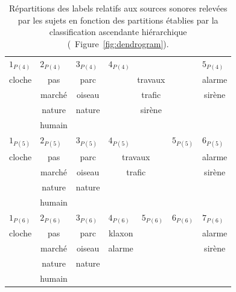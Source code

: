 \begin{table}[t]
\begin{tabular}{c|c|c|c|c|c|c}
\hline
\multicolumn{1}{l|}{$1_{P(4)}$} & \multicolumn{1}{l|}{$2_{P(4)}$} & \multicolumn{1}{l|}{$3_{P(4)}$}  & \multicolumn{3}{l|}{$4_{P(4)}$} & \multicolumn{1}{l}{$5_{P(4)}$} \\
cloche         & pas      & parc    & \multicolumn{3}{c|}{travaux} & alarme\\
               & marché   & oiseau  & \multicolumn{3}{c|}{trafic}  & sirène\\
               & nature   & nature  & \multicolumn{3}{c|}{sirène}  & \\
               & humain   &         & \multicolumn{3}{c|}{}        & \\
\hline
\multicolumn{1}{l|}{$1_{P(5)}$} & \multicolumn{1}{l|}{$2_{P(5)}$} & \multicolumn{1}{l|}{$3_{P(5)}$}  & \multicolumn{2}{l|}{$4_{P(5)}$} & \multicolumn{1}{l|}{$5_{P(5)}$} & \multicolumn{1}{l}{$6_{P(5)}$}\\ 
cloche          & pas      & parc    & \multicolumn{2}{c|}{travaux}     &     & alarme\\     
                & marché   & oiseau  & \multicolumn{2}{c|}{trafic}      &     & sirène\\  
                & nature   & nature  & \multicolumn{2}{c|}{}            &     &  \\  
                & humain   &         & \multicolumn{2}{c|}{}            &     &  \\                  
\hline
\multicolumn{1}{l|}{$1_{P(6)}$} & \multicolumn{1}{l|}{$2_{P(6)}$} & \multicolumn{1}{l|}{$3_{P(6)}$}  & \multicolumn{1}{l|}{$4_{P(6)}$} & \multicolumn{1}{l|}{$5_{P(6)}$} & \multicolumn{1}{l|}{$6_{P(6)}$} & \multicolumn{1}{l}{$7_{P(6)}$} \\  
cloche          & pas         & parc    & klaxon     &      &     & alarme \\        
                & marché      & oiseau  & alarme     &      &     & sirène \\  
                & nature      & nature  &            &      &     & \\  
                & humain      &         &            &      &     & \\  
\hline
\end{tabular}
\vspace{0.5mm}
\caption{Répartitions  des labels relatifs aux sources sonores relevées  par les sujets en fonction des partitions établies par la classification ascendante hiérarchique (\cf~Figure~\ref{fig:dendrogram}).}
\label{tab:markerHacSource}
\end{table}

